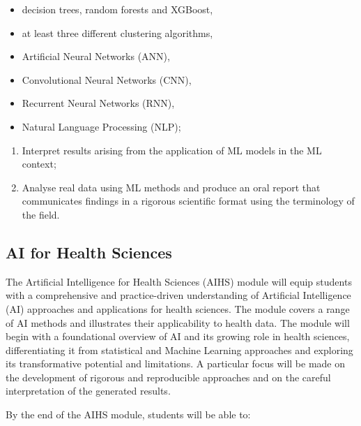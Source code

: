 \documentclass[
]{book}
\providecommand{\tightlist}{%
  \setlength{\itemsep}{0pt}\setlength{\parskip}{0pt}}
\begin{document}
\begin{itemize}
\tightlist
\item
  decision trees, random forests and XGBoost,
\item
  at least three different clustering algorithms,
\item
  Artificial Neural Networks (ANN),
\item
  Convolutional Neural Networks (CNN),
\item
  Recurrent Neural Networks (RNN),
\item
  Natural Language Processing (NLP);
\end{itemize}

\begin{enumerate}
\def\labelenumi{\arabic{enumi}.}
\setcounter{enumi}{4}
\tightlist
\item
  Interpret results arising from the application of ML models in the ML context;
\item
  Analyse real data using ML methods and produce an oral report that communicates findings in a rigorous scientific format using the terminology of the field.
\end{enumerate}

\subsection*{AI for Health Sciences}\label{ai-for-health-sciences}

The Artificial Intelligence for Health Sciences (AIHS) module will equip students with a comprehensive and practice-driven understanding of Artificial Intelligence (AI) approaches and applications for health sciences. The module covers a range of AI methods and illustrates their applicability to health data. The module will begin with a foundational overview of AI and its growing role in health sciences, differentiating it from statistical and Machine Learning approaches and exploring its transformative potential and limitations. A particular focus will be made on the development of rigorous and reproducible approaches and on the careful interpretation of the generated results.

By the end of the AIHS module, students will be able to:
\end{document}
